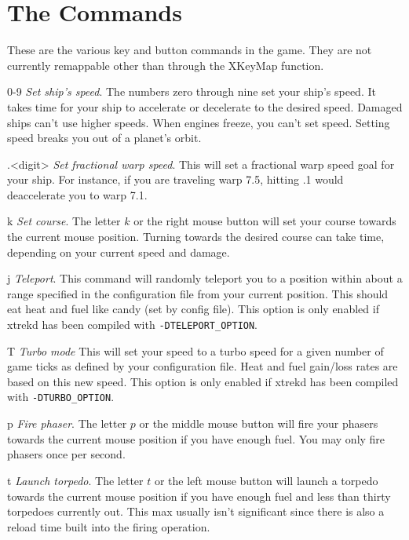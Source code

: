 \section{The Commands}
These are the various key and button commands in the game.
They are not currently remappable other than through the XKeyMap
function.

\begin{list}{}{
	\renewcommand{\makelabel}[1]{{\tt #1 \hfill}}
         \setlength{\leftmargin}{.5in}
         \setlength{\labelwidth}{\leftmargin}
         \setlength{\labelsep}{0in}
}
\item[0-9]{\em  Set ship's speed}.
The numbers zero through nine set your ship's speed.  It takes time for
your ship to accelerate or decelerate to the desired speed.  Damaged
ships can't use higher speeds.  When engines freeze, you can't set
speed.  Setting speed breaks you out of a planet's orbit.

\item[.<digit>]{\em Set fractional warp speed}.
This will set a fractional warp speed goal for your ship. For instance, if
you are traveling warp 7.5, hitting .1 would deaccelerate you to warp 7.1.

\item[k]{\em Set course}.
The letter $k$ or the right mouse button will set your course towards
the current mouse position.  Turning towards the desired course can
take time, depending on your current speed and damage.

\item[j]{\em Teleport}.
This command will randomly teleport you to a position within about a 
range specified in the configuration file from your current position. 
This should eat heat and fuel like candy (set
by config file). This option is only enabled if xtrekd has been compiled
with \verb|-DTELEPORT_OPTION|.

\item[T]{\em Turbo mode}
This will set your speed to a turbo speed for a given number of game ticks 
as defined by your configuration file. Heat and fuel gain/loss rates are
based on this new speed. This option is only enabled if xtrekd has been 
compiled with \verb|-DTURBO_OPTION|.

\item[p]{\em Fire phaser}.
The letter $p$ or the middle mouse button will fire your phasers
towards the current mouse position if you have enough fuel.  You may
only fire phasers once per second.

\item[t]{\em Launch torpedo}.
The letter $t$ or the left mouse button will launch a torpedo towards
the current mouse position if you have enough fuel and less than thirty
torpedoes currently out. This max usually isn't significant since there
is also a reload time built into the firing operation.


\end{list}
